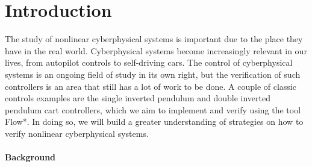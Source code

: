 \documentclass{article}
\theoremstyle{plain}
\theoremstyle{definition}
\theoremstyle{remark}
\begin{document}
\begin{abstract}
Balancing an inverted single and double pendulum system on a cart is a classical problem in the field of controls and cyber physical systems. Single and double pendulums are examples of non-linear systems, and the double pendulum specifically is a chaotic system which is more difficult to control. While the control of these systems has been thoroughly studied, the verification of such cyberphysical nonlinear systems is an ongoing field of research, with single and double inverted pendulum controllers being common benchmarks in this area. In this paper, we examine Linear Quadratic Regulator controllers for single and double inverted pendulum systems and implement these controllers in the reachability analysis tool Flow* \cite{FlowStar}. We then formulate strategies to verify the stability of these controllers using Flow*. We present a straightforward method of completely verifying the single inverted pendulum controller for an initial set, as well as a method for verifying the double inverted pendulum controller. Finally, we present our verification results for both the single and double inverted pendulum controllers.
\end{abstract}

\section{Introduction}
\label{sec:intro}
The study of nonlinear cyberphysical systems is important due to the place they have in the real world. Cyberphysical systems become increasingly relevant in our lives, from autopilot controls to self-driving cars. The control of cyberphysical systems is an ongoing field of study in its own right, but the verification of such controllers is an area that still has a lot of work to be done. A couple of classic controls examples are the single inverted pendulum and double inverted pendulum cart controllers, which we aim to implement and verify using the tool Flow*. In doing so, we will build a greater understanding of strategies on how to verify nonlinear cyberphysical systems.

\paragraph{Background} 
\end{document}
